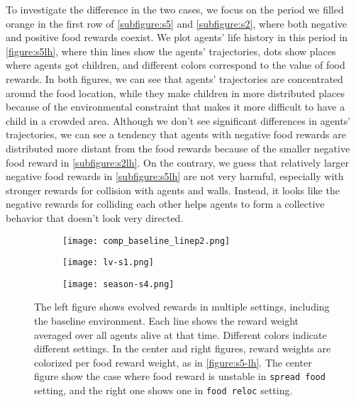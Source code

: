 To investigate the difference in the two cases, we focus on the period we filled orange in the first row of \cref{subfigure:s5} and \cref{subfigure:s2}, where both negative and positive food rewards coexist. We plot agents' life history in this period in \cref{figure:s5lh}, where thin lines show the agents' trajectories, dots show places where agents got children, and different colors correspond to the value of food rewards. In both figures, we can see that agents' trajectories are concentrated around the food location, while they make children in more distributed places because of the environmental constraint that makes it more difficult to have a child in a crowded area.
Although we don't see significant differences in agents' trajectories, we can see a tendency that agents with negative food rewards are distributed more distant from the food rewards because of the smaller negative food reward in \cref{subfigure:s2lh}. On the contrary, we guess that relatively larger negative food rewards in \cref{subfigure:s5lh} are not very harmful, especially with stronger rewards for collision with agents and walls. Instead, it looks like the negative rewards for colliding each other helps agents to form a collective behavior that doesn't look very directed.

\begin{figure}[t]
  \begin{subfigure}[t]{6cm}
    \centering
    \texttt{[image: comp\_baseline\_linep2.png]}
    \label{subfigure:blcomp}
  \end{subfigure}
  \begin{subfigure}[t]{4.5cm}
    \centering
    \texttt{[image: lv-s1.png]}
    \label{subfigure:lv1}
  \end{subfigure}
  \begin{subfigure}[t]{4.5cm}
    \centering
    \texttt{[image: season-s4.png]}
    \label{subfigure:season4}
  \end{subfigure}
  \caption{
    The left figure shows evolved rewards in multiple settings, including the baseline environment.
    Each line shows the reward weight averaged over all agents alive at that time.
    Different colors indicate different settings.
    In the center and right figures, reward weights are colorized per food reward weight, as in \cref{figure:s5-lh}. The center figure show the case where food reward is unstable in \texttt{spread food} setting, and the right one shows one in \texttt{food reloc} setting.
    \label{figure:foodloc-comp}
  }
\end{figure}

